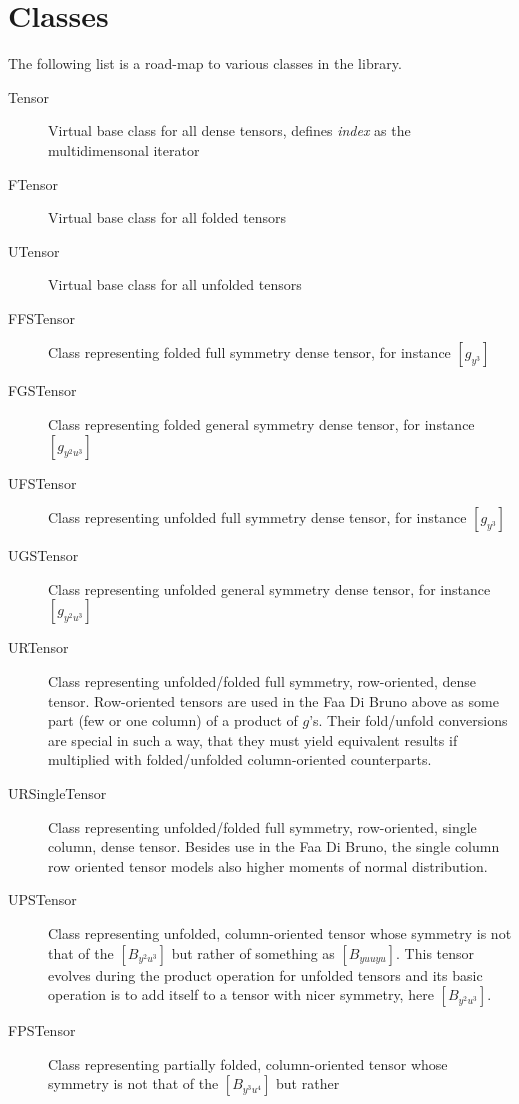 \documentclass[11pt,a4paper]{article}
\begin{document}
\section{Classes}

The following list is a road-map to various classes in the library.

\begin{description}
  
\item[Tensor] 
Virtual base class for all dense tensors, defines \emph{index} as the
multidimensonal iterator
\item[FTensor] 
Virtual base class for all folded tensors
\item[UTensor] 
Virtual base class for all unfolded tensors
\item[FFSTensor] 
Class representing folded full symmetry dense tensor,
for instance $\left[g_{y^3}\right]$
\item[FGSTensor] 
Class representing folded general symmetry dense tensor,
for instance $\left[g_{y^2u^3}\right]$
\item[UFSTensor] 
Class representing unfolded full symmetry dense tensor,
for instance $\left[g_{y^3}\right]$
\item[UGSTensor] 
Class representing unfolded general symmetry dense tensor,
for instance $\left[g_{y^2u^3}\right]$
\item[URTensor] 
Class representing unfolded/folded full symmetry, row-oriented,
dense tensor. Row-oriented tensors are used in the Faa Di Bruno
above as some part (few or one column) of a product of $g$'s. Their
fold/unfold conversions are special in such a way, that they must
yield equivalent results if multiplied with folded/unfolded
column-oriented counterparts.
\item[URSingleTensor] 
Class representing unfolded/folded full symmetry, row-oriented,
single column, dense tensor. Besides use in the Faa Di Bruno, the
single column row oriented tensor models also higher moments of normal
distribution.
\item[UPSTensor] 
Class representing unfolded, column-oriented tensor whose symmetry
is not that of the $\left[B_{y^2u^3}\right]$ but rather of something
as $\left[B_{yuuyu}\right]$. This tensor evolves during the product
operation for unfolded tensors and its basic operation is to add
itself to a tensor with nicer symmetry, here $\left[B_{y^2u^3}\right]$.
\item[FPSTensor] 
Class representing partially folded, column-oriented tensor whose
symmetry is not that of the $\left[B_{y^3u^4}\right]$ but rather

\end{description}
\end{document}
